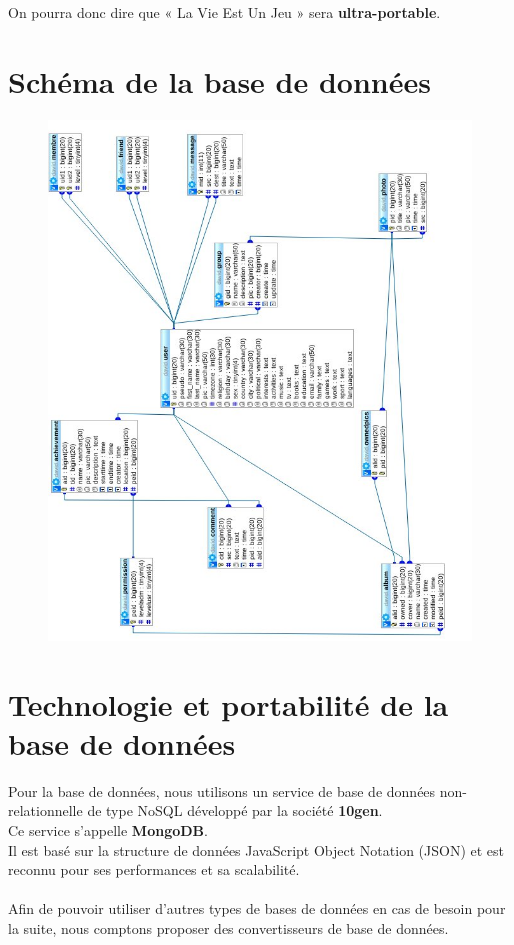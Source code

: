 \documentclass{life-fr}
\begin{document}
On pourra donc dire que « La Vie Est Un Jeu » sera \textbf{ultra-portable}.


\section{Schéma de la base de données}

\begin{figure}[H]
  \begin{center}
    \includegraphics[width=18cm]{img/imgdb.jpg}
  \end{center}
\end{figure}

\section{Technologie et portabilité de la base de données}

Pour la base de données, nous utilisons un service de base de données non-relationnelle de type NoSQL développé par la société \textbf{10gen}.\\
Ce service s'appelle \textbf{MongoDB}.\\
Il est basé sur la structure de données JavaScript Object Notation (JSON) et est reconnu pour ses performances et sa scalabilité.\\
\\
Afin de pouvoir utiliser d'autres types de bases de données en cas de besoin
pour la suite, nous comptons proposer des convertisseurs de base de données.\\
\end{document}
